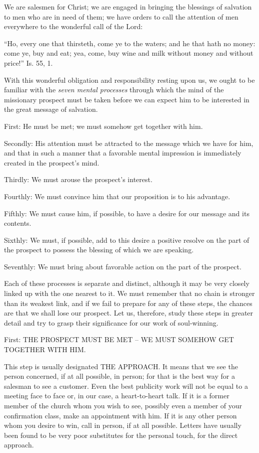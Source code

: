 \documentclass[
]{book}
\begin{document}
We are salesmen for Christ; we are engaged in bringing the blessings of salvation to men who are in need of them; we have orders to call the attention of men everywhere to the wonderful call of the Lord:

``Ho, every one that thirsteth, come ye to the waters; and he that hath no money: come ye, buy and eat; yea, come, buy wine and milk without money and without price!'' Is. 55, 1.

With this wonderful obligation and responsibility resting upon us, we ought to be familiar with the \emph{seven mental processes} through which the mind of the missionary prospect must be taken before we can expect him to be interested in the great message of salvation.

First: He must be met; we must somehow get together with him.

Secondly: His attention must be attracted to the message which we have for him, and that in such a manner that a favorable mental impression is immediately created in the prospect's mind.

Thirdly: We must arouse the prospect's interest.

Fourthly: We must convince him that our proposition is to his advantage.

Fifthly: We must cause him, if possible, to have a desire for our message and its contents.

Sixthly: We must, if possible, add to this desire a positive resolve on the part of the prospect to possess the blessing of which we are speaking.

Seventhly: We must bring about favorable action on the part of the prospect.

Each of these processes is separate and distinct, although it may be very closely linked up with the one nearest to it. We must remember that no chain is stronger than its weakest link, and if we fail to prepare for any of these steps, the chances are that we shall lose our prospect. Let us, therefore, study these steps in greater detail and try to grasp their significance for our work of soul-winning.

First: THE PROSPECT MUST BE MET -- WE MUST SOMEHOW GET TOGETHER WITH HIM.

This step is usually designated THE APPROACH. It means that we see the person concerned, if at all possible, in person; for that is the best way for a salesman to see a customer. Even the best publicity work will not be equal to a meeting face to face or, in our case, a heart-to-heart talk. If it is a former member of the church whom you wish to see, possibly even a member of your confirmation class, make an appointment with him. If it is any other person whom you desire to win, call in person, if at all possible. Letters have usually been found to be very poor substitutes for the personal touch, for the direct approach.
\end{document}
